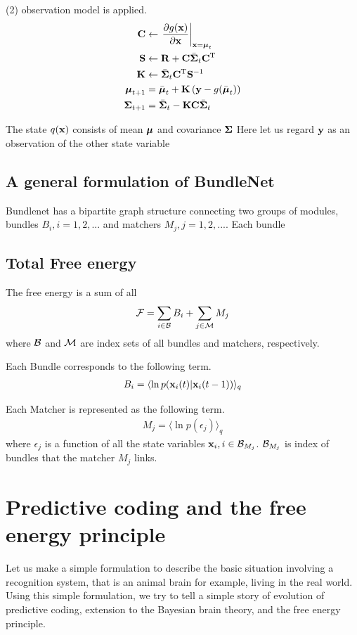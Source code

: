 \documentclass{article}
\begin{document}
(2) observation model is applied.
\begin{align*}
{\bf C} &\leftarrow \left. \frac{\partial g({\bf x})}{\partial {\bf x}} \right|_{{\bf x} = {\boldsymbol{\mu}}_t} \\
{\bf S} &\leftarrow {\bf R} + {\bf C} \bar{{\boldsymbol{\Sigma}}}_t {\bf C}{{}^{\rm T}}\\
{\bf K} &\leftarrow \bar{{\boldsymbol{\Sigma}}}_t {\bf C}{{}^{\rm T}} {\bf S}^{-1}\\
{\boldsymbol{\mu}}_{t+1} &= \bar{{\boldsymbol{\mu}}}_t + {\bf K} \left( {\bf y}-g(\bar{{\boldsymbol{\mu}}}_t ) \right)\\
{\boldsymbol{\Sigma}}_{t+1} &= \bar{{\boldsymbol{\Sigma}}}_t - {\bf K} {\bf C} \bar{{\boldsymbol{\Sigma}}}_t
\end{align*}


The state $q({\bf x})$ consists of mean ${\boldsymbol{\mu}}$ and covariance ${\boldsymbol{\Sigma}}$ 
Here let us regard ${\bf y}$ as an observation of the other state variable 



\subsection{A general formulation of BundleNet}
Bundlenet has a bipartite graph structure connecting two groups of modules, bundles $B_i, i=1,2,...$ and matchers $M_j, j=1,2,...$.
Each bundle 
\subsection{Total Free energy}
The free energy is a sum of all 
\begin{align}
{\cal F} = \sum_{i\in {\cal B}} B_{i} + \sum_{j\in {\cal M}} M_{j}
\end{align}
where ${\cal B}$ and ${\cal M}$ are index sets of all bundles and matchers, respectively.


Each Bundle corresponds to the following term.
\begin{align}
 B_{i} =\langle \ln p( {\bf x}_i(t)|{\bf x}_i(t-1) ) \rangle_{q}
\end{align}

Each Matcher is represented as the following term.
\begin{align}
 M_{j} =\langle \ln p( \epsilon_j ) \rangle_{q}
\end{align}
where $\epsilon_j$ is a function of all the state variables ${\bf x}_i, i\in {\cal B}_{M_j}$.
${\cal B}_{M_j}$ is index of bundles that the matcher $M_j$ links.







\section{Predictive coding and the free energy principle}
Let us make a simple formulation to describe the basic situation involving a recognition system, that is an animal brain for example, living in the real world. Using this simple formulation, we try to tell a simple story of evolution of predictive coding, extension to the Bayesian brain theory, and the free energy principle.
\end{document}
